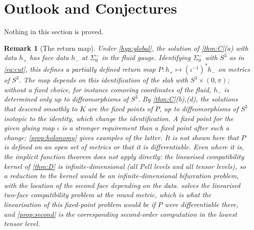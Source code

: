 \documentclass[11pt]{article}
\theoremstyle{canonmath}
\newtheorem{remark}[theorem]{Remark}
\theoremstyle{canonpostulate}
\theoremstyle{canonproposition}
\theoremstyle{canonmath}
\theoremstyle{canonproposition}
\providecommand{\Klein}{\mathcal{K}}
\def\mathcal#1{#1}%
\begin{document}
\clearpage

\section{Outlook and Conjectures}
\label{sec:outlook}

Nothing in this section is proved.

\begin{remark}[The return map]\label{rem:return}
Under \ref{hyp:global}, the solution of \cref{thm:C}(a) with data $h_+$ has face data $h_-$ at $\Sigma_0^-$ in the fluid gauge. Identifying $\Sigma_0^-$ with $S^3$ as in \eqref{eq:cut}, this defines a partially defined return map $\mathcal P: h_+\mapsto(\iota^{-1})^*h_-$ on metrics of $S^3$. The map depends on this identification of the slab with $S^3\times(0,\pi)$; without a fixed choice, for instance comoving coordinates of the fluid, $h_-$ is determined only up to diffeomorphisms of $S^3$. By \cref{thm:C}(b),(d), the solutions that descend smoothly to $\Klein$ are the fixed points of $\mathcal P$, up to diffeomorphisms of $S^3$ isotopic to the identity, which change the identification. A fixed point for the given gluing map $\iota$ is a stronger requirement than a fixed point after such a change; \cref{prop:holonomy} gives examples of the latter. It is not shown here that $\mathcal P$ is defined on an open set of metrics or that it is differentiable. Even where it is, the implicit function theorem does not apply directly: the linearised compatibility kernel of \cref{thm:D} is infinite-dimensional (all Pell levels and all tensor levels), so a reduction to the kernel would be an infinite-dimensional bifurcation problem, with the location of the second face depending on the data.  solves the linearised two-face compatibility problem at the round metric, which is what the linearisation of this fixed-point problem would be if $\mathcal P$ were differentiable there, and \cref{prop:second} is the corresponding second-order computation in the lowest tensor level.
\end{remark}
\end{document}

